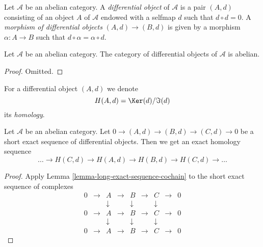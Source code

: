 \begin{definition}
\label{definition-differential-object}
Let $\mathcal{A}$ be an abelian category.
A {\it differential object} of $\mathcal{A}$
is a pair $(A, d)$ consisting of an
object $A$ of $\mathcal{A}$
endowed with a selfmap $d$ such that $d \circ d = 0$.
A {\it morphism of differential objects} $(A, d) \to (B, d)$
is given by a morphism $\alpha : A \to B$ such that
$d \circ \alpha = \alpha \circ d$.
\end{definition}

\begin{lemma}
\label{lemma-differential-objects-abelian}
Let $\mathcal{A}$ be an abelian category.
The category of differential objects of $\mathcal{A}$ is abelian.
\end{lemma}

\begin{proof}
Omitted.
\end{proof}

\begin{definition}
\label{definition-differential-object-homology}
For a differential object $(A, d)$ we denote
$$
H(A, d) = \Ker(d)/\Im(d)
$$
its {\it homology}.
\end{definition}

\begin{lemma}
\label{lemma-differential-objects-ses}
Let $\mathcal{A}$ be an abelian category.
Let $0 \to (A, d) \to (B, d) \to (C, d) \to 0$ be a short exact sequence
of differential objects. Then we get an exact homology sequence
$$
\ldots \to H(C, d) \to H(A, d) \to H(B, d) \to H(C, d) \to \ldots
$$
\end{lemma}

\begin{proof}
Apply Lemma \ref{lemma-long-exact-sequence-cochain}
to the short exact sequence of complexes
$$
\begin{matrix}
0 & \to & A & \to & B & \to & C & \to & 0 \\
& & \downarrow & & \downarrow & & \downarrow \\
0 & \to & A & \to & B & \to & C & \to & 0 \\
& & \downarrow & & \downarrow & & \downarrow \\
0 & \to & A & \to & B & \to & C & \to & 0
\end{matrix}
$$
\end{proof}

